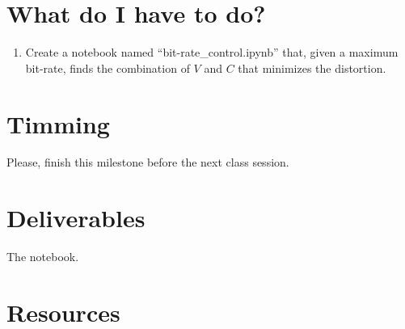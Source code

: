 

\section{What do I have to do?}

\begin{enumerate}
\item Create a notebook named ``bit-rate\_control.ipynb'' that, given
  a maximum bit-rate, finds the combination of $V$ and $C$ that
  minimizes the distortion.
\end{enumerate}


\section{Timming}

Please, finish this milestone before the next class session.

\section{Deliverables}

The notebook.

\section{Resources}

\renewcommand{\addcontentsline}[3]{} %

